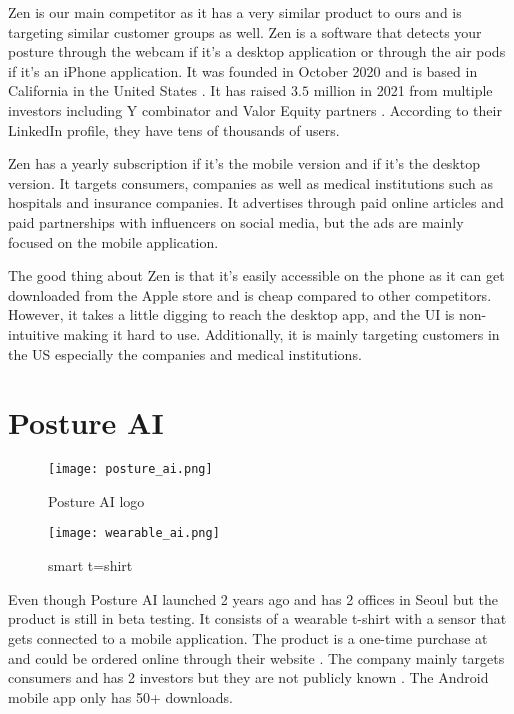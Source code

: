 Zen is our main competitor as it has a very similar product to ours and is targeting similar customer groups as well. Zen is a software that detects your posture through the webcam if it’s a desktop application or through the air pods if it’s an iPhone application.  It was founded in October 2020 and is based in California in the United States \cite{zen_crunchbase}. It has raised $3.5$ million in 2021 from multiple investors including Y combinator\cite{posturehealth_ycombinator} and Valor Equity partners \cite{zen_techcrunch}. According to their LinkedIn\cite{posturehealth_linkedin} profile, they have tens of thousands of users. 

Zen has a  yearly subscription if it’s the mobile version and  if it’s the desktop version. It targets consumers, companies as well as medical institutions such as hospitals and insurance companies. It advertises through paid online articles and paid partnerships with influencers on social media, but the ads are mainly focused on the mobile application.

The good thing about Zen is that it’s easily accessible on the phone as it can get downloaded from the Apple store and is cheap compared to other competitors. However, it takes a little digging to reach the desktop app, and the UI is non-intuitive making it hard to use. Additionally, it is mainly targeting customers in the US especially the companies and medical institutions.

\section{Posture AI}
\begin{figure}[H]
    \centering
    \texttt{[image: posture\_ai.png]}
    \caption{Posture AI logo}
    \label{fig:enter-label0}
\end{figure}

\begin{figure}[H]
    \centering
    \texttt{[image: wearable\_ai.png]}
    \caption{smart t=shirt}
    \label{fig:enter-label1}
\end{figure}
Even though Posture AI launched 2 years ago and has 2 offices in Seoul \cite{postureai_linkedin} but the product is still in beta testing. It consists of a wearable t-shirt with a sensor that gets connected to a mobile application. The product is a one-time purchase at  and could be ordered online through their website \cite{myposture}. The company mainly targets consumers and has 2 investors but they are not publicly known \cite{postureai_pitchbook}. The Android mobile app only has 50+ downloads. 

